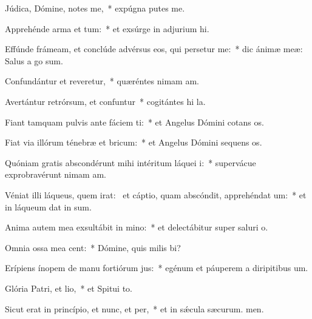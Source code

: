 \item Júdica, Dómine, notes me,~* expúgna putes me.
\item Apprehénde arma et tum:~* et exsúrge in adjurium hi.
\item Effúnde frámeam, et conclúde advérsus eos, qui persetur me:~* dic ánimæ meæ: Salus a go sum.
\item Confundántur et reveretur,~* quæréntes nimam am.
\item Avertántur retrórsum, et confuntur~* cogitántes hi la.
\item Fiant tamquam pulvis ante fáciem ti:~* et Angelus Dómini cotans os.
\item Fiat via illórum ténebræ et bricum:~* et Angelus Dómini sequens os.
\item Quóniam gratis abscondérunt mihi intéritum láquei i:~* supervácue exprobravérunt nimam am.
\item Véniat illi láqueus, quem irat:~\pscross{} et cáptio, quam abscóndit, apprehéndat um:~* et in láqueum dat in sum.
\item Anima autem mea exsultábit in mino:~* et delectábitur super saluri o.
\item Omnia ossa mea cent:~* Dómine, quis milis bi?
\item Erípiens ínopem de manu fortiórum jus:~* egénum et páuperem a diripitibus um.
\item Glória Patri, et lio,~* et Spitui to.
\item Sicut erat in princípio, et nunc, et per,~* et in sǽcula sæcurum. men.
